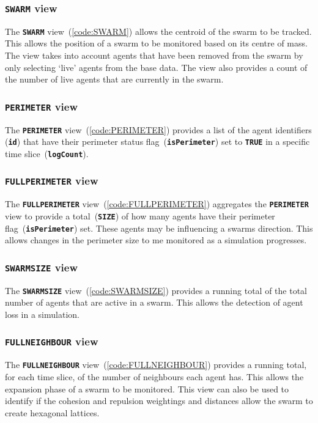 \subsubsection{\texttt{\textbf{SWARM}} view}
The \texttt{\textbf{SWARM}} view~(\autoref{code:SWARM}) allows the centroid of the swarm to be tracked. This allows the position of a swarm to be monitored based on its centre of mass. The view takes into account agents that have been removed from the swarm by only selecting `live' agents from the base data. The view also provides a count of the number of live agents that are currently in the swarm.

\subsubsection{\texttt{\textbf{PERIMETER}} view}
The \texttt{\textbf{PERIMETER}} view~(\autoref{code:PERIMETER}) provides a list of the agent identifiers (\texttt{\textbf{id}}) that have their perimeter status flag~(\texttt{\textbf{isPerimeter}}) set to \texttt{\textbf{TRUE}} in a specific time slice~(\texttt{\textbf{logCount}}).

\subsubsection{\texttt{\textbf{FULLPERIMETER}} view}
The \texttt{\textbf{FULLPERIMETER}} view~(\autoref{code:FULLPERIMETER}) aggregates the \texttt{\textbf{PERIMETER}} view to provide a total~(\texttt{\textbf{SIZE}}) of how many agents have their perimeter flag~(\texttt{\textbf{isPerimeter}}) set. These agents may be influencing a swarms direction. This allows changes in the perimeter size to me monitored as a simulation progresses.

\subsubsection{\texttt{\textbf{SWARMSIZE}} view}
The \texttt{\textbf{SWARMSIZE}} view~(\autoref{code:SWARMSIZE}) provides a running total of the total number of agents that are active in a swarm. This allows the detection of agent loss in a simulation.

\subsubsection{\texttt{\textbf{FULLNEIGHBOUR}} view}
The \texttt{\textbf{FULLNEIGHBOUR}} view~(\autoref{code:FULLNEIGHBOUR}) provides a running total, for each time slice, of the number of neighbours each agent has. This allows the expansion phase of a swarm to be monitored. This view can also be used to identify if the cohesion and repulsion weightings and distances allow the swarm to create hexagonal lattices.

